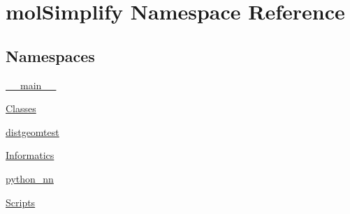 \hypertarget{namespacemolSimplify}{}\section{mol\+Simplify Namespace Reference}
\label{namespacemolSimplify}
\subsection*{Namespaces}
\begin{DoxyCompactItemize}
\item 
 \hyperlink{namespacemolSimplify_1_1____main____}{\+\_\+\+\_\+main\+\_\+\+\_\+}
\item 
 \hyperlink{namespacemolSimplify_1_1Classes}{Classes}
\item 
 \hyperlink{namespacemolSimplify_1_1distgeomtest}{distgeomtest}
\item 
 \hyperlink{namespacemolSimplify_1_1Informatics}{Informatics}
\item 
 \hyperlink{namespacemolSimplify_1_1python__nn}{python\+\_\+nn}
\item 
 \hyperlink{namespacemolSimplify_1_1Scripts}{Scripts}
\end{DoxyCompactItemize}
